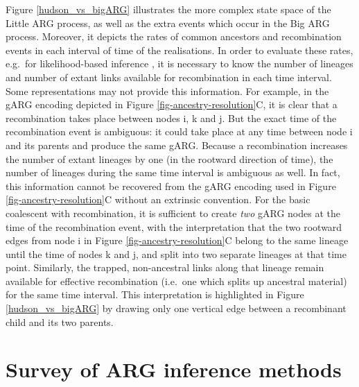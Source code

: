 \documentclass{article}
\newcommand{\noderef}[1]{\textsf{#1}}
\begin{document}
Figure \ref{hudson_vs_bigARG} illustrates the more complex state space
of the Little ARG process, as well as the extra events which occur in the Big ARG process.
Moreover, it depicts the rates of common ancestors and recombination events in each
interval of time of the realisations.
In order to evaluate these rates, e.g.\ for likelihood-based inference
\citep{baumdicker2021efficient, mahmoudi2022bayesian},
it is necessary to know the number of lineages and number of extant links
available for recombination in each time interval.
Some representations may not provide this information.
For example, in the gARG encoding depicted in Figure \ref{fig-ancestry-resolution}C,
it is clear that a recombination takes place between nodes \noderef{i}, \noderef{k} and \noderef{j}.
But the exact time of the recombination event is ambiguous: it could take place at any time between node \noderef{i} and its parents and produce the same gARG.
Because a recombination increases the number of extant lineages by one (in the rootward direction of time), the number of lineages during the same time interval is ambiguous as well.
In fact, this information cannot be recovered from the gARG encoding used in Figure \ref{fig-ancestry-resolution}C without an extrinsic convention.
For the basic coalescent with recombination,
it is sufficient to create \emph{two} gARG nodes at the time of the recombination event, with the interpretation that the two rootward edges from node \noderef{i} in Figure \ref{fig-ancestry-resolution}C belong to the same lineage until the time of nodes \noderef{k} and \noderef{j}, and split into two separate lineages at that time point.
Similarly, the trapped, non-ancestral links along that lineage remain available for effective recombination (i.e.\ one which splits up ancestral material) for the same time interval.
This interpretation is highlighted in
Figure \ref{hudson_vs_bigARG} by drawing only one vertical edge between a recombinant child and its two parents.



\section{Survey of ARG inference methods}
\label{sec-survey-arg-infer}
\end{document}
